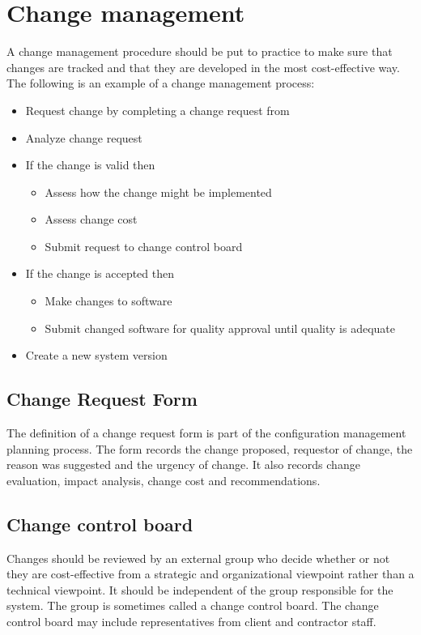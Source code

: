 \section{Change management}
A change management procedure should be put to practice to make sure that changes are tracked and that they are developed in the most cost-effective way. The following is an example of a change management process:
\begin{itemize}
    \item Request change by completing a change request from
    \item Analyze change request
    \item If the change is valid then
    \begin{itemize}
        \item Assess how the change might be implemented
        \item Assess change cost
        \item Submit request to change control board
    \end{itemize}
    \item If the change is accepted then
    \begin{itemize}
        \item Make changes to software
        \item Submit changed software for quality approval until quality is adequate
    \end{itemize}
    \item Create a new system version
\end{itemize}

\subsection{Change Request Form}
The definition of a change request form is part of the configuration management planning process. The form records the change proposed, requestor of change, the reason was suggested and the urgency of change. It also records change evaluation, impact analysis, change cost and recommendations.

\subsection{Change control board}
Changes should be reviewed by an external group who decide whether or not they are cost-effective from a strategic and organizational viewpoint rather than a technical viewpoint. It should be independent of the group responsible for the system. The group is sometimes called a change control board. The change control board may include representatives from client and contractor staff.
